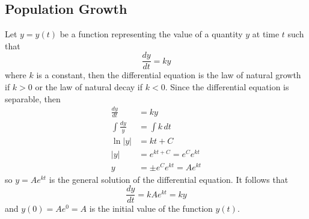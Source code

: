 \subsection{Population Growth}
Let \(y=y(t)\) be a function representing the value of a quantity \(y\) at
time \(t\) such that
\[\frac{dy}{dt}=ky\]
where \(k\) is a constant, then the differential equation is the law of
natural growth if \(k>0\) or the law of natural decay if \(k<0\).
Since the differential equation is separable, then
\begin{align*}
    \frac{dy}{dt} &= ky \\
    \int\frac{dy}{y} &= \int k\,dt \\
    \ln|y| &= kt+C \\
    |y| &= e^{kt+C}=e^Ce^{kt} \\
    y &= \pm e^Ce^{kt}=Ae^{kt}
\end{align*}
so \(y=Ae^{kt}\) is the general solution of the differential equation.
It follows that
\[\frac{dy}{dt}=kAe^{kt}=ky\]
and \(y(0)=Ae^0=A\) is the initial value of the function \(y(t)\).

